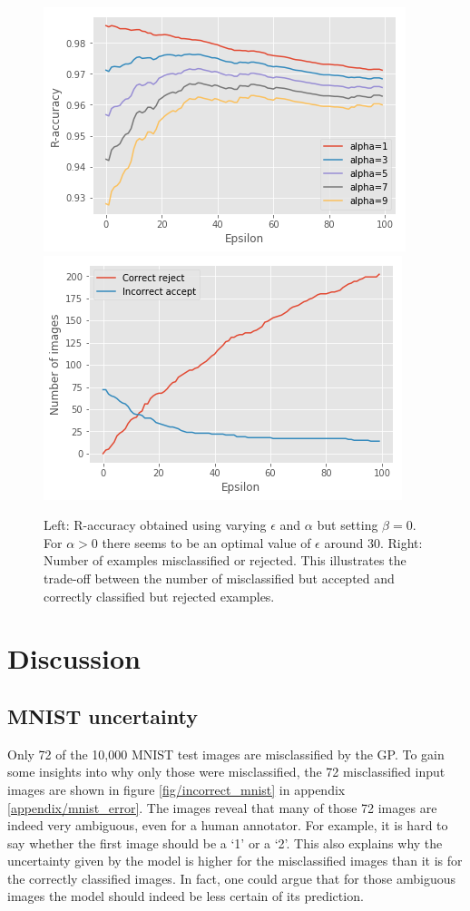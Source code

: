 \documentclass{article}
\begin{document}
\begin{figure}[h]
	\centering
	\includegraphics[scale=0.35]{r_accs_alpha_mnist}
	\includegraphics[scale=0.35]{r_acc_mnist}
	\caption{Left: R-accuracy obtained using varying $\epsilon$ and $\alpha$ but setting $\beta=0$. For $\alpha>0$ there seems to be an optimal value of $\epsilon$ around 30. Right: Number of examples misclassified or rejected. This illustrates the trade-off between the number of misclassified but accepted and correctly classified but rejected examples.}
	\label{fig/r_accs_alpha_mnist}
\end{figure}

\section{Discussion}
\subsection{MNIST uncertainty}
Only 72 of the 10,000 MNIST test images are misclassified by the GP. To gain some insights into why only those were misclassified, the 72 misclassified input images are shown in figure \ref{fig/incorrect_mnist} in appendix \ref{appendix/mnist_error}. The images reveal that many of those 72 images are indeed very ambiguous, even for a human annotator. For example, it is hard to say whether the first image should be a `1' or a `2'. This also explains why the uncertainty given by the model is higher for the misclassified images than it is for the correctly classified images. In fact, one could argue that for those ambiguous images the model should indeed be less certain of its prediction.
\end{document}
